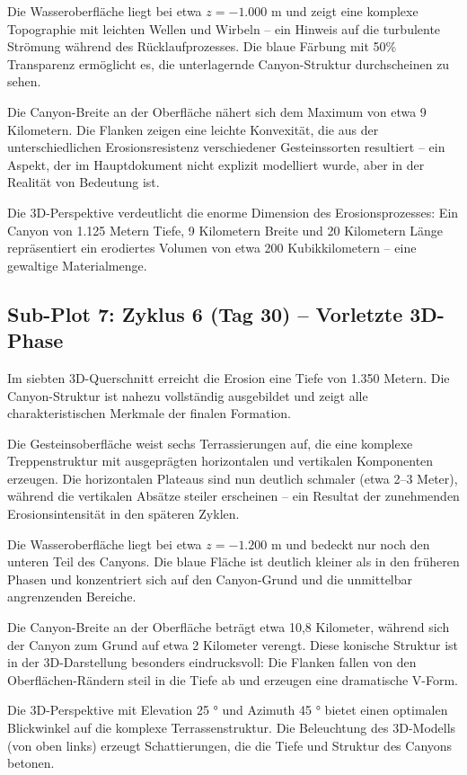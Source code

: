 ﻿\documentclass[12pt,a4paper]{report}
\begin{document}
Die Wasseroberfläche liegt bei etwa $z = -1.000$ m und zeigt eine komplexe Topographie mit leichten Wellen und Wirbeln -- ein Hinweis auf die turbulente Strömung während des Rücklaufprozesses. Die blaue Färbung mit 50\% Transparenz ermöglicht es, die unterlagernde Canyon-Struktur durchscheinen zu sehen.

Die Canyon-Breite an der Oberfläche nähert sich dem Maximum von etwa 9 Kilometern. Die Flanken zeigen eine leichte Konvexität, die aus der unterschiedlichen Erosionsresistenz verschiedener Gesteinssorten resultiert -- ein Aspekt, der im Hauptdokument nicht explizit modelliert wurde, aber in der Realität von Bedeutung ist.

Die 3D-Perspektive verdeutlicht die enorme Dimension des Erosionsprozesses: Ein Canyon von 1.125 Metern Tiefe, 9 Kilometern Breite und 20 Kilometern Länge repräsentiert ein erodiertes Volumen von etwa 200 Kubikkilometern -- eine gewaltige Materialmenge.

\subsection{Sub-Plot 7: Zyklus 6 (Tag 30) -- Vorletzte 3D-Phase}

Im siebten 3D-Querschnitt erreicht die Erosion eine Tiefe von 1.350 Metern. Die Canyon-Struktur ist nahezu vollständig ausgebildet und zeigt alle charakteristischen Merkmale der finalen Formation.

Die Gesteinsoberfläche weist sechs Terrassierungen auf, die eine komplexe Treppenstruktur mit ausgeprägten horizontalen und vertikalen Komponenten erzeugen. Die horizontalen Plateaus sind nun deutlich schmaler (etwa 2--3 Meter), während die vertikalen Absätze steiler erscheinen -- ein Resultat der zunehmenden Erosionsintensität in den späteren Zyklen.

Die Wasseroberfläche liegt bei etwa $z = -1.200$ m und bedeckt nur noch den unteren Teil des Canyons. Die blaue Fläche ist deutlich kleiner als in den früheren Phasen und konzentriert sich auf den Canyon-Grund und die unmittelbar angrenzenden Bereiche.

Die Canyon-Breite an der Oberfläche beträgt etwa 10,8 Kilometer, während sich der Canyon zum Grund auf etwa 2 Kilometer verengt. Diese konische Struktur ist in der 3D-Darstellung besonders eindrucksvoll: Die Flanken fallen von den Oberflächen-Rändern steil in die Tiefe ab und erzeugen eine dramatische V-Form.

Die 3D-Perspektive mit Elevation 25 ° und Azimuth 45 ° bietet einen optimalen Blickwinkel auf die komplexe Terrassenstruktur. Die Beleuchtung des 3D-Modells (von oben links) erzeugt Schattierungen, die die Tiefe und Struktur des Canyons betonen.
\end{document}
